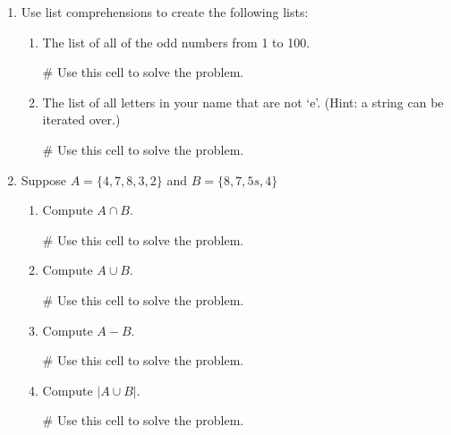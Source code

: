\documentclass{ximera}
\begin{document}
    \begin{enumerate}
    	\item Use list comprehensions to create the following lists:
    	\begin{enumerate}
        	\item The list of all of the odd numbers from 1 to 100.
\begin{sageCell}
# Use this cell to solve the problem.
\end{sageCell}
        	\item The list of all letters in your name that are not `e'. (Hint: a string can be iterated over.)
\begin{sageCell}
# Use this cell to solve the problem.
\end{sageCell}
    	\end{enumerate}
    	\item Suppose $A=\{4,7,8,3,2\}$ and $B=\{8,7,5s,4\}$
        \begin{enumerate}
        	\item Compute $A\cap B$.
\begin{sageCell}
# Use this cell to solve the problem.
\end{sageCell}
        	\item Compute $A\cup B$.
\begin{sageCell}
# Use this cell to solve the problem.
\end{sageCell}
         	\item Compute $A-B$.
\begin{sageCell}
# Use this cell to solve the problem.
\end{sageCell}
         	\item Compute $|A\cup B|$.
\begin{sageCell}
# Use this cell to solve the problem.
\end{sageCell}
        \end{enumerate}
    \end{enumerate}
\end{document}
